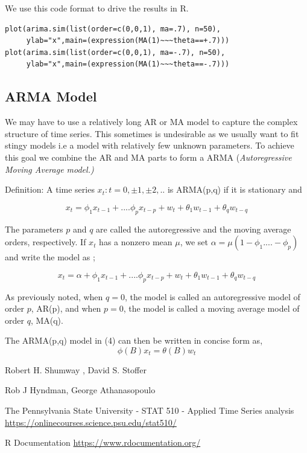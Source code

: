 \documentclass[a4paper]{article}
\theoremstyle{definition}
\begin{document}
We use this code format to drive the results in R. 
\begin{lstlisting}
plot(arima.sim(list(order=c(0,0,1), ma=.7), n=50),
	 ylab="x",main=(expression(MA(1)~~~theta==+.7)))
plot(arima.sim(list(order=c(0,0,1), ma=-.7), n=50),
	 ylab="x",main=(expression(MA(1)~~~theta==-.7)))
\end{lstlisting}
	
	
\subsection{ARMA Model}	
We may have to use a relatively long AR or MA model to capture the complex structure of time series. This sometimes is undesirable as we usually want to fit stingy models i.e a model with relatively few unknown parameters.  To achieve this goal we combine the AR and MA parts to form a ARMA (\textit{Autoregressive Moving Average model.)}

\begin{paragraph}{Definition:}
A time series $ {x_t: t = 0,\pm 1, \pm 2,..} $ is ARMA(p,q) if it is stationary and 

\begin{equation}
x_t = \phi_1 x_{t-1} +....\phi_p x_{t-p} +w_t + \theta_1 w_{t-1} +\theta_q w_{t-q}
\end{equation}
\end{paragraph}

The parameters $ p $ and $ q $ are called the autoregressive and the moving average orders, respectively. If $ x_t $ has a nonzero mean $ \mu $, we set $ \alpha = \mu(1-\phi_1....-\phi_p) $ and write the model as ;

\begin{equation*}
x_t = \alpha + \phi_1 x_{t-1} +....\phi_p x_{t-p} +w_t + \theta_1 w_{t-1} +\theta_q w_{t-q}
\end{equation*}

As previously noted, when $ q = 0 $, the model is called an autoregressive model of order $ p $, AR(p), and when $ p = 0 $, the model is called a moving average model of order $ q $, MA(q).
	
The ARMA(p,q) model in (4) can then be written in concise form as,
\begin{equation}
\phi(B) x_t = \theta(B) w_t
\end{equation}

\newpage
\begin{thebibliography}{9}
	\bibitem{} 
	Robert H. Shumway , David S. Stoffer
	
	\bibitem{}
	Rob J Hyndman, George Athana­sopou­lo
	
	\bibitem{}
	The Pennsylvania State University - STAT 510 - Applied Time Series analysis \\
	\newblock \url{https://onlinecourses.science.psu.edu/stat510/}	
	
	\bibitem{}
	R Documentation
	\newblock \url{https://www.rdocumentation.org/}	 	
	
\end{thebibliography}
		
	
\end{document}
